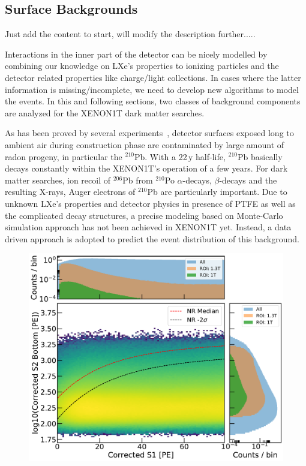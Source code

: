 \subsection{Surface Backgrounds}
Just add the content to start, will modify the description further.....

Interactions in the inner part of the detector can be nicely modelled by combining our knowledge on LXe's properties to ionizing particles and the detector related properties like charge/light collections. In cases where the latter information is missing/incomplete, we need to develop new algorithms to model the events. In this and following sections, two classes of background components are analyzed for the XENON1T dark matter searches.

As has been proved by several experiments~\cite{cdms, deap}, detector surfaces exposed long to ambient air during construction phase are contaminated by large amount of radon progeny, in particular the $^{210}$Pb. With a 22\,y half-life, $^{210}$Pb basically decays constantly within the XENON1T's operation of a few years. For dark matter searches, ion recoil of $^{206}$Pb from $^{210}$Po $\alpha$-decays, $\beta$-decays and the resulting X-rays, Auger electrons of $^{210}$Pb are particularly important. Due to unknown LXe's properties and detector physics in presence of PTFE as well as the complicated decay structures, a precise modeling based on Monte-Carlo simulation approach has not been achieved in XENON1T yet. Instead, a data driven approach is adopted to predict the event distribution of this background. 




\begin{figure}[tbp]
\centering
\includegraphics[width=\columnwidth]{Plots/surface_s2s1_distribution_blessed_sr1.pdf}
\caption{\label{fig:surface_bg} 
}
\end{figure}



